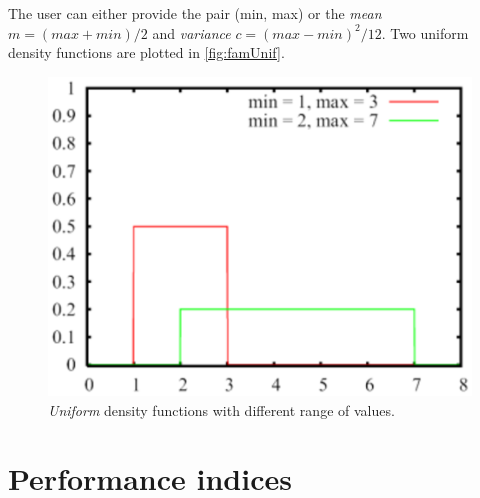 The user can either provide the pair (min, max) or the \emph{mean}
$m=(max+min)/2$ and \emph{variance} $c=(max-min)^2 / 12$. Two
uniform density functions are plotted in \autoref{fig:famUnif}.
\begin{figure}[htb]
    \begin{center}
        \includegraphics[scale=.5]{img/jsimg/4.13.eps}
    \end{center}
    \caption{\emph{Uniform} density functions with different range of values.}
    \label{fig:famUnif}
\end{figure}

\section{Performance indices}
\label{perfinde}

